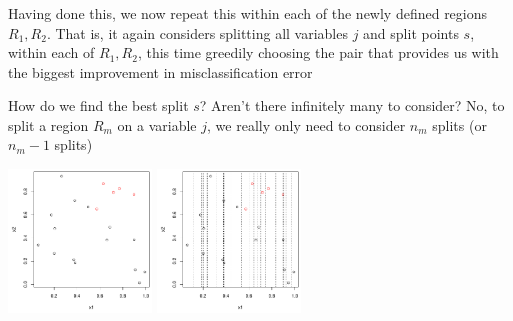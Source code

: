 \documentclass[mathserif]{beamer}
\def\red{\color[rgb]{0.8,0,0}}
\begin{document}
\begin{frame}
\frametitle{}
\smallskip
\bigskip
Having done this, we now repeat this within each of the newly defined
regions $R_1,R_2$. That is, it again considers splitting all variables $j$ and
split points $s$,  within each of $R_1,R_2$, this time greedily choosing the pair 
that provides us with the biggest {\red improvement} in misclassification error

\bigskip
How do we find the best split $s$? Aren't there {\red infinitely many} to consider?
No, to split a region $R_m$ on a variable $j$, we really only need to consider $n_m$ 
splits (or $n_m-1$ splits)

\smallskip
\begin{center}
\includegraphics[width=1.5in]{split1.pdf}
\includegraphics[width=1.5in]{split2.pdf}
\end{center}
\end{frame}
\end{document}
